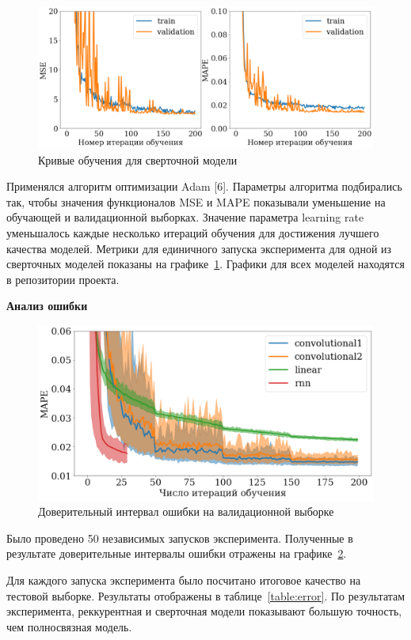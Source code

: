 \documentclass[12pt, twoside]{article}
\begin{document}
\begin{figure}[!htbp]
	\centering
	\includegraphics[scale=0.4]{img/single_experiment.pdf}
	\caption{Кривые обучения для сверточной модели}
	\label{fig:singleexp}
\end{figure}
Применялся алгоритм оптимизации Adam [6]. Параметры алгоритма подбирались так, чтобы значения функционалов MSE и MAPE показывали уменьшение на обучающей и валидационной выборках. Значение параметра learning rate уменьшалось каждые несколько итераций обучения для достижения лучшего качества моделей. Метрики для единичного запуска эксперимента для одной из сверточных моделей показаны на графике~\ref{fig:singleexp}. Графики для всех моделей находятся в репозитории проекта.


\textbf{Анализ ошибки}

\begin{figure}[!htbp]
	\centering
	\includegraphics[scale=0.4]{img/multerror.pdf}
	\caption{Доверительный интервал ошибки на валидационной выборке}
	\label{fig:multerr}
\end{figure}
Было проведено 50 независимых запусков эксперимента. Полученные в результате доверительные интервалы ошибки отражены на графике~\ref{fig:multerr}.

Для каждого запуска эксперимента было посчитано итоговое качество на тестовой выборке. Результаты отображены в таблице~\ref{table:error}. По результатам эксперимента, реккурентная и сверточная модели показывают большую точность, чем полносвязная модель.
\end{document}
